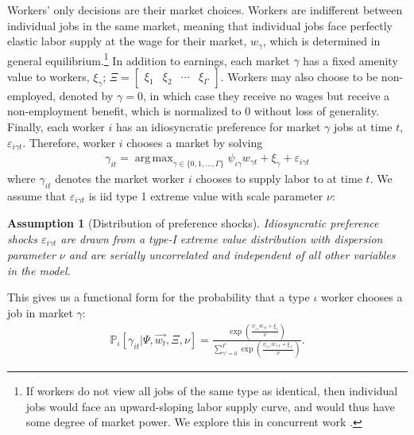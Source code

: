 \documentclass[12pt]{article}
\def\ig{\iota\gamma}
\def\g{\gamma}
\def\i{\iota}
\DeclareMathOperator*{\argmax}{arg\,max}
\renewcommand{\P}{\mathbb {P}}
\theoremstyle{definition}
\theoremstyle{plain}
\newtheorem{assumption}[theorem]{Assumption}
\def\ve{\varepsilon}
\begin{document}
Workers' only decisions are their market choices. Workers are indifferent between individual jobs in the same market, meaning that individual jobs face perfectly elastic labor supply at the wage for their market, $w_{\g}$, which is determined in general equilibrium.\footnote{If workers do not view all jobs of the same type as identical, then individual jobs would face an upward-sloping labor supply curve, and would thus have some degree of market power. We explore this in concurrent work \citep{ModenesiFogel2021}.} In addition to earnings, each market $\g$ has a fixed amenity value to workers, $\xi_{\g}$; $\Xi = \begin{bmatrix}	\xi_1 & \xi_2 & \cdots &  \xi_{\Gamma}	\end{bmatrix}$.   Workers may also choose to be non-employed, denoted by $\g=0$, in which case they receive no wages but receive a non-employment benefit, which is normalized to 0 without loss of generality. Finally, each worker $i$ has an idiosyncratic preference for market $\g$ jobs at time $t$, $\ve_{i\g t}$. Therefore, worker $i$ chooses a market by solving
\begin{align}
\g_{it} = \argmax_{\g \in \{0,1,\dots,\Gamma\}} \psi_{\ig} w_{\g t} + \xi_{\g} + \ve_{i\g t} \label{eq:worker_max}
\end{align}
where $\g_{it}$ denotes the market worker $i$ chooses to supply labor to at time $t$. We assume that $\ve_{i\g t}$ is iid type 1 extreme value with scale parameter $\nu$:

\begin{assumption}[Distribution of preference shocks]
	\label{ass:taste_shocks}
	Idiosyncratic preference shocks $\ve_{i\g t}$ are drawn from a type-I extreme value distribution with dispersion parameter $\nu$ and are serially uncorrelated and independent of all other variables in the model.
\end{assumption}


 This gives us a functional form for the probability that a type $\i$ worker chooses a job in market $\g$:
\begin{align}
\P_{\i}[\g_{it}|\Psi,\vec{w_t},\Xi,\nu]= \frac{\exp \left( \frac{\psi_{\ig} w_{\g t} + \xi_{\g}}{\nu} \right) }{ \sum\limits_{\g'=0}^{\Gamma} \exp \left( \frac{\psi_{\ig'} w_{\g' t} + \xi_{\g'}}{\nu} \right) }. \label{eq:emp_probs}
\end{align} 
\end{document}
